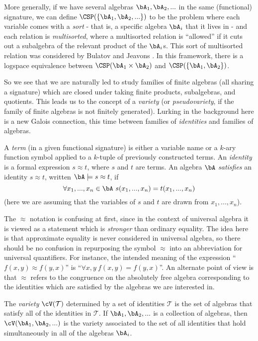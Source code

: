 More generally, if we have several algebras $\bA_1, \bA_2, ...$ in the same (functional) signature, we can define $\CSP(\{\bA_1, \bA_2, ...\})$ to be the problem where each variable comes with a \emph{sort} - that is, a specific algebra $\bA_i$ that it lives in - and each relation is \emph{multisorted}, where a multisorted relation is ``allowed'' if it cuts out a subalgebra of the relevant product of the $\bA_i$s. This sort of multisorted relation was considered by Bulatov and Jeavons \cite{bulatov-jeavons-varieties}. In this framework, there is a logspace equivalence between $\CSP(\bA_1 \times \bA_2)$ and $\CSP(\{\bA_1, \bA_2\})$.

So we see that we are naturally led to study families of finite algebras (all sharing a signature) which are closed under taking finite products, subalgebras, and quotients. This leads us to the concept of a \emph{variety} (or \emph{pseudovariety}, if the family of finite algebras is not finitely generated). Lurking in the background here is a new Galois connection, this time between families of \emph{identities} and families of algebras.

\begin{defn} A \emph{term} (in a given functional signature) is either a variable name or a $k$-ary function symbol applied to a $k$-tuple of previously constructed terms. An \emph{identity} is a formal expression $s \approx t$, where $s$ and $t$ are terms. An algebra $\bA$ \emph{satisfies} an identity $s \approx t$, written $\bA \models s \approx t$, if
\[
\forall x_1, ..., x_n \in \bA\  s(x_1, ..., x_n) = t(x_1, ..., x_n)
\]
(here we are assuming that the variables of $s$ and $t$ are drawn from $x_1, ..., x_n$).
\end{defn}

The $\approx$ notation is confusing at first, since in the context of universal algebra it is viewed as a statement which is \emph{stronger} than ordinary equality. The idea here is that approximate equality is never considered in universal algebra, so there should be no confusion in repurposing the symbol $\approx$ into an abbreviation for universal quantifiers. For instance, the intended meaning of the expression ``$f(x,y) \approx f(y,x)$'' is ``$\forall x,y\ f(x,y) = f(y,x)$''. An alternate point of view is that $\approx$ refers to the congruence on the absolutely free algebra corresponding to the identities which are satisfied by the algebras we are interested in.

\begin{defn} The \emph{variety} $\cV(\mathcal{T})$ determined by a set of identities $\mathcal{T}$ is the set of algebras that satisfy all of the identities in $\mathcal{T}$. If $\bA_1, \bA_2, ...$ is a collection of algebras, then $\cV(\bA_1, \bA_2, ...)$ is the variety associated to the set of all identities that hold simultaneously in all of the algebras $\bA_i$.
\end{defn}

